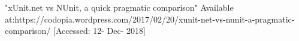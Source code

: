  "xUnit.net vs NUnit, a quick pragmatic comparison" Available at:https://codopia.wordpress.com/2017/02/20/xunit-net-vs-nunit-a-pragmatic-comparison/ [Accessed: 12- Dec- 2018]